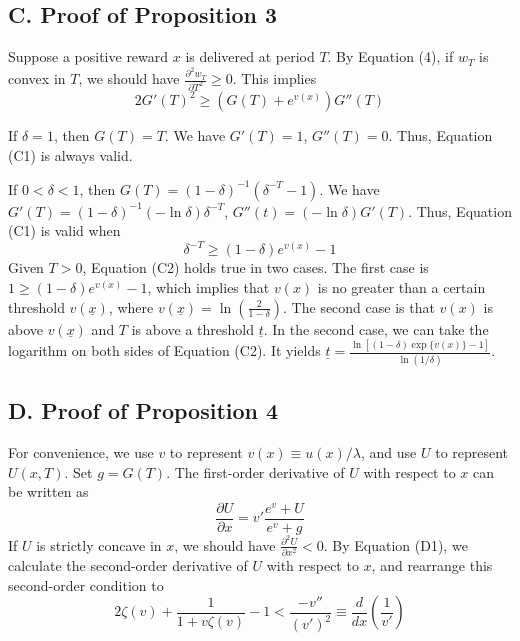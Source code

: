 \documentclass[
  12pt,
]{article}
\begin{document}
\hypertarget{c.-proof-of-proposition-3}{%
\subsection*{C. Proof of Proposition
3}\label{c.-proof-of-proposition-3}}

Suppose a positive reward \(x\) is delivered at period \(T\). By
Equation (4), if \(w_T\) is convex in \(T\), we should have
\(\frac{\partial^2 w_T}{\partial T^2}\geq 0\). This
implies\[\tag{C1} 2G'(T)^2\geq(G(T)+e^{v(x)})G''(T) \]

If \(\delta=1\), then \(G(T)=T\). We have \(G'(T)=1\), \(G''(T)=0\).
Thus, Equation (C1) is always valid.

If \(0<\delta<1\), then \(G(T)=(1-\delta)^{-1}(\delta^{-T}-1)\). We have
\(G'(T)=(1-\delta)^{-1}(-\ln\delta)\delta^{-T}\),
\(G''(t)=(-\ln\delta)G'(T)\). Thus, Equation (C1) is valid when
\[\tag{C2} \delta^{-T}\geq(1-\delta)e^{v(x)}-1 \]Given \(T>0\), Equation
(C2) holds true in two cases. The first case is
\(1\geq (1-\delta)e^{v(x)}-1\), which implies that \(v(x)\) is no
greater than a certain threshold \(v(\underline{x})\), where
\(v(\underline{x})=\ln(\frac{2}{1-\delta})\). The second case is that
\(v(x)\) is above \(v(\underline{x})\) and \(T\) is above a threshold
\(\underline{t}\). In the second case, we can take the logarithm on both
sides of Equation (C2). It yields
\(\underline{t}=\frac{\ln[(1-\delta)\exp\{v(x)\}-1]}{\ln(1/\delta)}\).

\hypertarget{d.-proof-of-proposition-4}{%
\subsection*{D. Proof of Proposition
4}\label{d.-proof-of-proposition-4}}

For convenience, we use \(v\) to represent \(v(x)\equiv u(x)/\lambda\),
and use \(U\) to represent \(U(x,T)\). Set \(g= G(T)\). The first-order
derivative of \(U\) with respect to \(x\) can be written as\[\tag{D1}
\frac{\partial U}{\partial x}=v'\frac{e^v+U}{e^v+g}
\]If \(U\) is strictly concave in \(x\), we should have
\(\frac{\partial^2 U}{\partial x^2}<0\). By Equation (D1), we calculate
the second-order derivative of \(U\) with respect to \(x\), and
rearrange this second-order condition to\[\tag{D2}
2\zeta(v)+\frac{1}{1+v\zeta(v)}-1<\frac{-v''}{(v')^2}\equiv\frac{d}{dx}\left(\frac{1}{v'}\right)
\]
\end{document}
